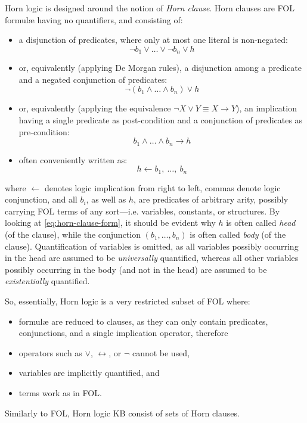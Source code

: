 \documentclass[12pt,a4paper,openright,twoside]{book}
\begin{document}
Horn logic is designed around the notion of \emph{Horn clause}.
%
Horn clauses are FOL formul\ae{} having no quantifiers, and consisting of:
%
\begin{itemize}
    \item a disjunction of predicates, where only at most one literal is non-negated:
    \begin{equation*}
        \lnot b_1 \vee \ldots \vee \lnot b_n \vee h
    \end{equation*}

    \item or, equivalently (applying De Morgan rules), a disjunction among a predicate and a negated conjunction of predicates:
    \begin{equation*}
        \lnot (b_1 \wedge \ldots \wedge b_n) \vee h
    \end{equation*}

    \item or, equivalently (applying the equivalence $\lnot X \vee Y \equiv X \rightarrow Y$), an implication having a single predicate as post-condition and a conjunction of predicates as pre-condition:
    \begin{equation*}
        b_1 \wedge \ldots \wedge b_n \rightarrow h
    \end{equation*}

    \item often conveniently written as:
    \begin{equation}\label{eq:horn-clause-form}
        h \leftarrow b_1,\ \ldots,\ b_n
    \end{equation}

\end{itemize}
%
where $\leftarrow$ denotes logic implication from right to left, commas denote logic conjunction, and all $b_i$, as well as $h$, are predicates of arbitrary arity, possibly carrying FOL terms of any sort---i.e. variables, constants, or structures.
%
By looking at \cref{eq:horn-clause-form}, it should be evident why $h$ is often called \emph{head} (of the clause), while the conjunction $(b_1, \ldots, b_n)$ is often called \emph{body} (of the clause).
%
Quantification of variables is omitted, as all variables possibly occurring in the head are assumed to be \emph{universally} quantified, whereas all other variables possibly occurring in the body (and not in the head) are assumed to be \emph{existentially} quantified.

So, essentially, Horn logic is a very restricted subset of FOL where:
%
\begin{itemize}
    \item formul\ae{} are reduced to clauses, as they can only contain predicates, conjunctions, and a single implication operator, therefore
    \item operators such as $\vee$, $\leftrightarrow$, or $\lnot$ cannot be used,
    \item variables are implicitly quantified, and
    \item terms work as in FOL.
\end{itemize}
%
Similarly to FOL, Horn logic KB consist of sets of Horn clauses.
\end{document}
